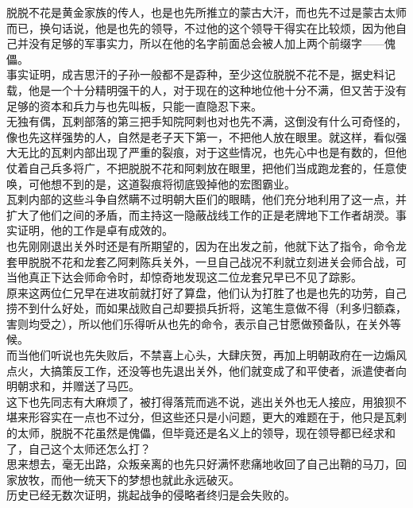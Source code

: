 \begin{multicols}{\theparacolNo}
脱脱不花是黄金家族的传人，也是也先所推立的蒙古大汗，而也先不过是蒙古太师而已，换句话说，他是也先的领导，不过他的这个领导干得实在比较烦，因为他自己并没有足够的军事实力，所以在他的名字前面总会被人加上两个前缀字——傀儡。\\

事实证明，成吉思汗的子孙一般都不是孬种，至少这位脱脱不花不是，据史料记载，他是一个十分精明强干的人，对于现在的这种地位他十分不满，但又苦于没有足够的资本和兵力与也先叫板，只能一直隐忍下来。\\

无独有偶，瓦剌部落的第三把手知院阿剌也对也先不满，这倒没有什么可奇怪的，像也先这样强势的人，自然是老子天下第一，不把他人放在眼里。就这样，看似强大无比的瓦剌内部出现了严重的裂痕，对于这些情况，也先心中也是有数的，但他仗着自己兵多将广，不把脱脱不花和阿剌放在眼里，把他们当成跑龙套的，任意使唤，可他想不到的是，这道裂痕将彻底毁掉他的宏图霸业。\\

瓦剌内部的这些斗争自然瞒不过明朝大臣们的眼睛，他们充分地利用了这一点，并扩大了他们之间的矛盾，而主持这一隐蔽战线工作的正是老牌地下工作者胡濙。事实证明，他的工作是卓有成效的。\\

也先刚刚退出关外时还是有所期望的，因为在出发之前，他就下达了指令，命令龙套甲脱脱不花和龙套乙阿剌陈兵关外，一旦自己战况不利就立刻进关会师合战，可当他真正下达会师命令时，却惊奇地发现这二位龙套兄早已不见了踪影。\\

原来这两位仁兄早在进攻前就打好了算盘，他们认为打胜了也是也先的功劳，自己捞不到什么好处，而如果战败自己却要损兵折将，这笔生意做不得（利多归额森，害则均受之），所以他们乐得听从也先的命令，表示自己甘愿做预备队，在关外等候。\\

而当他们听说也先失败后，不禁喜上心头，大肆庆贺，再加上明朝政府在一边煽风点火，大搞策反工作，还没等也先退出关外，他们就变成了和平使者，派遣使者向明朝求和，并赠送了马匹。\\

这下也先同志有大麻烦了，被打得落荒而逃不说，逃出关外也无人接应，用狼狈不堪来形容实在一点也不过分，但这些还只是小问题，更大的难题在于，他只是瓦剌的太师，脱脱不花虽然是傀儡，但毕竟还是名义上的领导，现在领导都已经求和了，自己这个太师还怎么打？\\

思来想去，毫无出路，众叛亲离的也先只好满怀悲痛地收回了自己出鞘的马刀，回家放牧，而他一统天下的梦想也就此永远破灭。\\

历史已经无数次证明，挑起战争的侵略者终归是会失败的。\\
\ifnum{}
	\end{multicols}
\fi
\newpage
